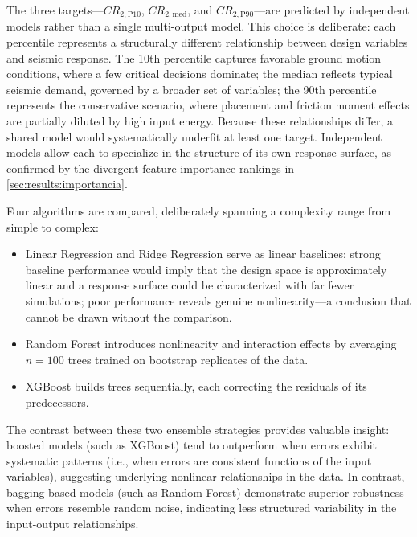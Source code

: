 \documentclass[preprint,12pt,authoryear]{elsarticle}
\newcommand{\CR}[1]{CR_{2,\text{#1}}}
\begin{document}
The three targets---$\CR{P10}$, $\CR{med}$, and $\CR{P90}$---are predicted by independent models rather than a single multi-output model. This choice is deliberate: each percentile represents a structurally different relationship between design variables and seismic response. The 10th percentile captures favorable ground motion conditions, where a few critical decisions dominate; the median reflects typical seismic demand, governed by a broader set of variables; the 90th percentile represents the conservative scenario, where placement and friction moment effects are partially diluted by high input energy. Because these relationships differ, a shared model would systematically underfit at least one target. Independent models allow each to specialize in the structure of its own response surface, as confirmed by the divergent feature importance rankings in \cref{sec:results:importancia}.

Four algorithms are compared, deliberately spanning a complexity range from simple to complex: 

\begin{itemize}
	\renewcommand{\labelitemi}{---}
	\item Linear Regression and Ridge Regression \citep{Hastie2009} serve as linear baselines: strong baseline performance would imply that the design space is approximately linear and a response surface could be characterized with far fewer simulations; poor performance reveals genuine nonlinearity---a conclusion that cannot be drawn without the comparison.
	\item Random Forest \citep{Breiman2001} introduces nonlinearity and interaction effects by averaging $n = 100$ trees trained on bootstrap replicates of the data.
	\item XGBoost \citep{Chen2016} builds trees sequentially, each correcting the residuals of its predecessors.
\end{itemize} 

The contrast between these two ensemble strategies provides valuable insight: boosted models (such as XGBoost) tend to outperform when errors exhibit systematic patterns (i.e., when errors are consistent functions of the input variables), suggesting underlying nonlinear relationships in the data. In contrast, bagging-based models (such as Random Forest) demonstrate superior robustness when errors resemble random noise, indicating less structured variability in the input-output relationships.
\end{document}
